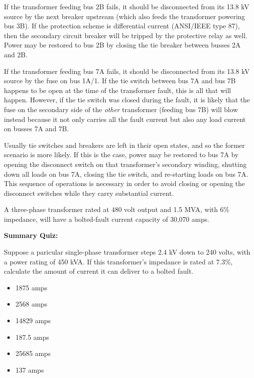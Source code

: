 \vskip 10pt

If the transformer feeding bus 2B fails, it should be disconnected from its 13.8 kV source by the next breaker upstream (which also feeds the transformer powering bus 3B).  If the protection scheme is differential current (ANSI/IEEE type 87), then the secondary circuit breaker will be tripped by the protective relay as well.  Power may be restored to bus 2B by closing the tie breaker between busses 2A and 2B.

\vskip 10pt

If the transformer feeding bus 7A fails, it should be disconnected from its 13.8 kV source by the fuse on bus 1A/1.  If the tie switch between bus 7A and bus 7B happens to be open at the time of the transformer fault, this is all that will happen.  However, if the tie switch was closed during the fault, it is likely that the fuse on the secondary side of the {\it other} transformer (feeding bus 7B) will blow instead because it not only carries all the fault current but also any load current on busses 7A and 7B.  

Usually tie switches and breakers are left in their open states, and so the former scenario is more likely.  If this is the case, power may be restored to bus 7A by opening the disconnect switch on that transformer's secondary winding, shutting down all loads on bus 7A, closing the tie switch, and re-starting loads on bus 7A.  This sequence of operations is necessary in order to avoid closing or opening the disconnect switches while they carry substantial current.

\vskip 10pt

A three-phase transformer rated at 480 volt output and 1.5 MVA, with 6\% impedance, will have a bolted-fault current capacity of 30,070 amps.









\vfil \eject

\noindent
{\bf Summary Quiz:}

Suppose a paricular single-phase transformer steps 2.4 kV down to 240 volts, with a power rating of 450 kVA.  If this transformer's impedance is rated at 7.3\%, calculate the amount of current it can deliver to a bolted fault.

\begin{itemize}
\item{} 1875 amps
\vskip 5pt 
\item{} 2568 amps
\vskip 5pt 
\item{} 14829 amps
\vskip 5pt 
\item{} 187.5 amps
\vskip 5pt 
\item{} 25685 amps
\vskip 5pt 
\item{} 137 amps
\end{itemize}





